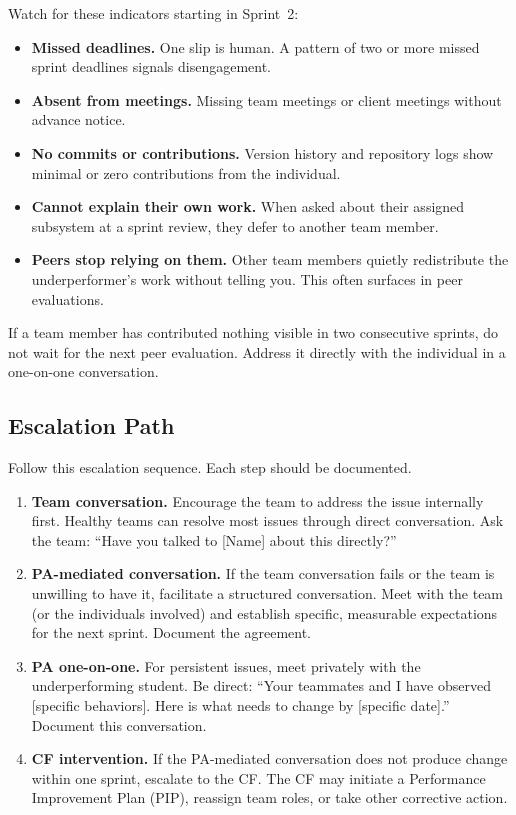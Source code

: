 Watch for these indicators starting in Sprint~2:

\begin{itemize}[nosep,leftmargin=1.5em]
\item \textbf{Missed deadlines.} One slip is human. A pattern of two or more missed sprint deadlines signals disengagement.
\item \textbf{Absent from meetings.} Missing team meetings or client meetings without advance notice.
\item \textbf{No commits or contributions.} Version history and repository logs show minimal or zero contributions from the individual.
\item \textbf{Cannot explain their own work.} When asked about their assigned subsystem at a sprint review, they defer to another team member.
\item \textbf{Peers stop relying on them.} Other team members quietly redistribute the underperformer's work without telling you. This often surfaces in peer evaluations.
\end{itemize}

\begin{redflag}
If a team member has contributed nothing visible in two consecutive sprints, do not wait for the next peer evaluation. Address it directly with the individual in a one-on-one conversation.
\end{redflag}

\subsection{Escalation Path}

Follow this escalation sequence. Each step should be documented.

\begin{enumerate}[nosep,leftmargin=1.5em]
\item \textbf{Team conversation.} Encourage the team to address the issue internally first. Healthy teams can resolve most issues through direct conversation. Ask the team: ``Have you talked to [Name] about this directly?''

\item \textbf{PA-mediated conversation.} If the team conversation fails or the team is unwilling to have it, facilitate a structured conversation. Meet with the team (or the individuals involved) and establish specific, measurable expectations for the next sprint. Document the agreement.

\item \textbf{PA one-on-one.} For persistent issues, meet privately with the underperforming student. Be direct: ``Your teammates and I have observed [specific behaviors]. Here is what needs to change by [specific date].'' Document this conversation.

\item \textbf{CF intervention.} If the PA-mediated conversation does not produce change within one sprint, escalate to the CF. The CF may initiate a Performance Improvement Plan (PIP), reassign team roles, or take other corrective action.
\end{enumerate}

